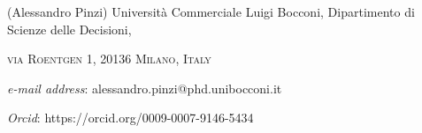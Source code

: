 \documentclass[10pt,leqno]{amsart}
\numberwithin{equation}{section}
\begin{document}
{\small
		
		\vspace{15pt} (Alessandro Pinzi) Universit\`{a} Commerciale Luigi Bocconi, Dipartimento di Scienze delle Decisioni, \par
		\textsc{via Roentgen 1, 20136 Milano, Italy}
		\par
		\textit{e-mail address}: \textsf{alessandro.pinzi@phd.unibocconi.it}
		\par
		\textit{Orcid}: \textsf{https://orcid.org/0009-0007-9146-5434}
		\par
	
		
	}
\end{document}
